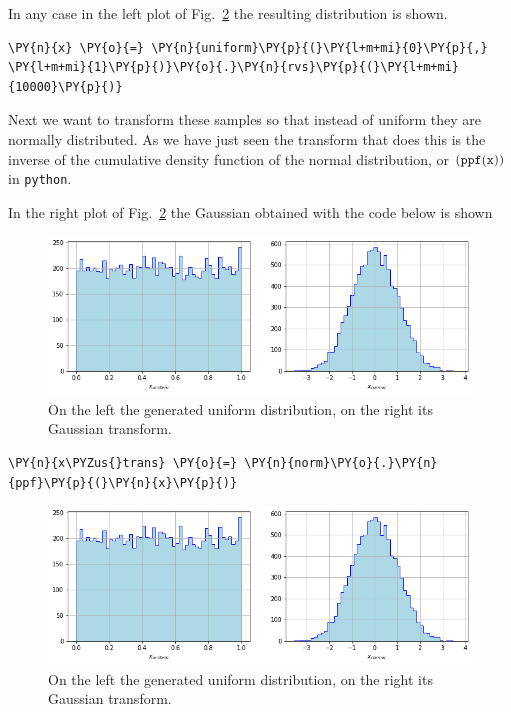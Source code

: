 In any case in the left plot of Fig.~\ref{fig:uniform_and_gauss} the resulting distribution is shown.

\begin{codebox}
\begin{Verbatim}[commandchars=\\\{\}]
\PY{n}{x} \PY{o}{=} \PY{n}{uniform}\PY{p}{(}\PY{l+m+mi}{0}\PY{p}{,} \PY{l+m+mi}{1}\PY{p}{)}\PY{o}{.}\PY{n}{rvs}\PY{p}{(}\PY{l+m+mi}{10000}\PY{p}{)}
\end{Verbatim}
\end{codebox}

Next we want to transform these samples so that instead of uniform they
are normally distributed. As we have just seen the transform that does this
is the inverse of the cumulative density function of the normal 
distribution, or \((\tt{ppf(x))}\) in \texttt{python}. 

In the right plot of Fig.~\ref{fig:uniform_and_gauss} the Gaussian obtained 
with the code below is shown

\begin{figure}[h]
  \centering
  \includegraphics[width=1.\textwidth]{figures/uniform_gauss.png}
  \caption{On the left the generated uniform distribution, on the right its Gaussian transform.}
  \label{fig:uniform_and_gauss}
\end{figure}

\begin{codebox}
\begin{Verbatim}[commandchars=\\\{\}]
\PY{n}{x\PYZus{}trans} \PY{o}{=} \PY{n}{norm}\PY{o}{.}\PY{n}{ppf}\PY{p}{(}\PY{n}{x}\PY{p}{)}
\end{Verbatim}
\end{codebox}

\begin{figure}[htb]
	\centering
	\includegraphics[width=1.\textwidth]{figures/uniform_gauss.png}
	\caption{On the left the generated uniform distribution, on the right its Gaussian transform.}
	\label{fig:uniform_and_gauss}
\end{figure}

